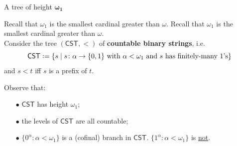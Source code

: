 \documentclass{beamer}
\theoremstyle{num.custom-title}
\theoremstyle{custom-title}
\newcommand{\CST}{\ensuremath{\mathsf{CST}}\xspace}
\newcommand*{\defeq}{\mathrel{\rlap{%
                     \raisebox{0.3ex}{$\cdot$}}%
                     \raisebox{-0.3ex}{$\cdot$}}%
                     =}
\renewcommand{\emph}[1]{\textbf{#1}}
\begin{document}
\begin{frame}{A tree of height $\pmb{\omega_1}$}

\begin{overprint}
 Recall that $\omega_1$ is the smallest cardinal greater than $\omega$.
 Recall that $\omega_1$ is the smallest cardinal greater than $\omega$.\\
Consider the tree $(\CST,<)$ of \emph{countable binary strings}, i.e.
\[
\CST \defeq \{s \mid s \colon \alpha \to \{0,1\} \text{ with $\alpha < \omega_1$ and $s$ has finitely-many 1's}\}
\]
and $s<t$ iff $s$ is a prefix of $t$.


\vspace{-2pt}
Observe that:
\vspace{-4pt}
\begin{itemize}
\item[\textcolor{mLightBrown}{$\bullet$}] \CST has height $\omega_1$;
\item[\textcolor{mLightBrown}{$\bullet$}] the levels of \CST are all countable; 
\item[\textcolor{mLightBrown}{$\bullet$}] $\{0^\alpha : \alpha {<} \omega_1\}$ is a (cofinal) branch in \CST. $\{1^\alpha : \alpha {<} \omega_1\}$ is \underline{not}.
\end{itemize}
\end{overprint}

\vspace{-18pt}

\end{frame}
\end{document}
